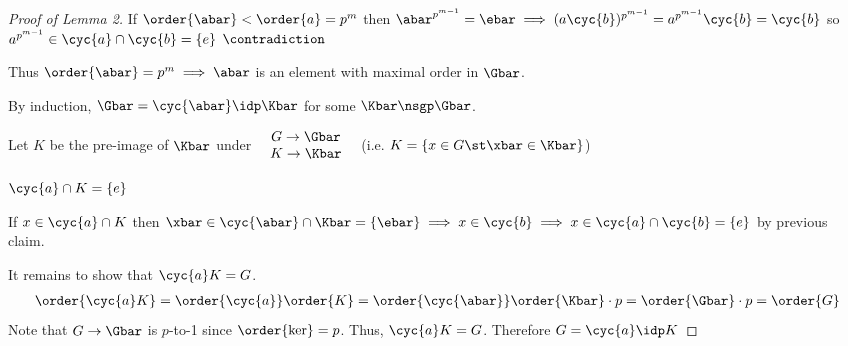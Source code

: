 \begin{proof}[Proof of Lemma 2]
     If \(\order{\abar} < \order{a} = p^m\) then \(\abar^{p^{m-1}} = \ebar \implies (a\cyc{b})^{p^{m-1}} = a^{p^{m-1}}\cyc{b} = \cyc{b}\) so \(a^{p^{m-1}}\in\cyc{a}\cap\cyc{b}=\{e\}\) \(\contradiction\)

     Thus \(\order{\abar} = p^m \implies \abar\) is an element with maximal order in \(\Gbar\).

     By induction, \(\Gbar = \cyc{\abar}\idp\Kbar\) for some \(\Kbar\nsgp\Gbar\).

     Let \(K\) be the pre-image of \(\Kbar\) under \(\quad \begin{matrix}
         G\to \Gbar \\
         K\to\Kbar
     \end{matrix}\quad \)
     (i.e. \(K = \{x\in G \st \xbar\in\Kbar\}\))

     \begin{claim}
         \(\cyc{a}\cap K = \{e\}\)
     \end{claim}
     \begin{subproof}
         \vspace*{-1em}If \(x\in\cyc{a}\cap K \) then \(\xbar \in\cyc{\abar}\cap\Kbar = \{\ebar\} \implies x\in\cyc{b} \implies x\in\cyc{a}\cap\cyc{b} = \{e\}\) by previous claim.
     \end{subproof}
     It remains to show that \(\cyc{a}K = G\).
     \begin{align*}
         \order{\cyc{a}K} = \order{\cyc{a}}\order{K} = \order{\cyc{\abar}}\order{\Kbar}\cdot p = \order{\Gbar}\cdot p = \order{G}
     \end{align*}
     Note that \(G\to \Gbar\) is \(p\)-to-1 since \(\order{\ker} = p\).  Thus, \(\cyc{a}K = G\).  Therefore \(G = \cyc{a}\idp K\)
 \end{proof}